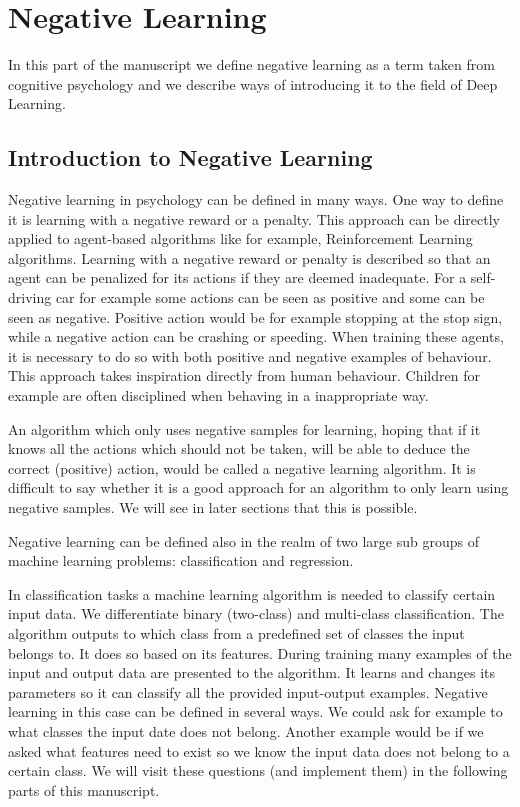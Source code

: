 \documentclass[b5paper]{book}
\begin{document}
\part{Negative Learning}

In this part of the manuscript we define negative learning as a term taken from cognitive psychology and we describe ways of introducing it to the field of Deep Learning.

\chapter{Introduction to Negative Learning}

Negative learning in psychology can be defined in many ways. One way to define it is learning with a negative reward or a penalty. This approach can be directly applied to agent-based algorithms like for example, Reinforcement Learning algorithms. Learning with a negative reward or penalty is described so that an agent can be penalized for its actions if they are deemed inadequate. For a self-driving car for example some actions can be seen as positive and some can be seen as negative. Positive action would be for example stopping at the stop sign, while a negative action can be crashing or speeding. When training these agents, it is necessary to do so with both positive and negative examples of behaviour. This approach takes inspiration directly from human behaviour. Children for example are often disciplined when behaving in a inappropriate way.

An algorithm which only uses negative samples for learning, hoping that if it knows all the actions which should not be taken, will be able to deduce the correct (positive) action, would be called a negative learning algorithm. It is difficult to say whether it is a good approach for an algorithm to only learn using negative samples. We will see in later sections that this is possible.

Negative learning can be defined also in the realm of two large sub groups of machine learning problems: classification and regression.

In classification tasks a machine learning algorithm is needed to classify certain input data. We differentiate binary (two-class) and multi-class classification. The algorithm outputs to which class from a predefined set of classes the input belongs to. It does so based on its features. During training many examples of the input and output data are presented to the algorithm. It learns and changes its parameters so it can classify all the provided input-output examples. Negative learning in this case can be defined in several ways. We could ask for example to what classes the input date does not belong. Another example would be if we asked what features need to exist so we know the input data does not belong to a certain class. We will visit these questions (and implement them) in the following parts of this manuscript.
\end{document}
